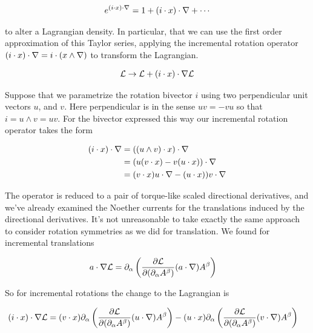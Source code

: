 \begin{align}\label{eqn:rotationCurrents:foo1}
e^{(i \cdot x) \cdot \nabla} = 1 + (i \cdot x) \cdot \nabla + \cdots
\end{align}

to alter a Lagrangian density.  In particular, that we can use the first order approximation of this Taylor series, applying the incremental rotation operator $(i \cdot x) \cdot \nabla = i \cdot (x \wedge \nabla)$ to transform the Lagrangian.

\begin{align}\label{eqn:rotationCurrents:foo2}
\mathcal{L} \rightarrow \mathcal{L} + (i \cdot x) \cdot \nabla \mathcal{L}
\end{align}

Suppose that we parametrize the rotation bivector $i$ using two perpendicular unit vectors $u$, and $v$.  Here perpendicular is in the sense $u v = -v u$ so that $i = u \wedge v = u v$.  For the bivector expressed this way our incremental rotation operator takes the form

\begin{align*}
(i \cdot x) \cdot \nabla 
&=
((u \wedge v) \cdot x) \cdot \nabla \\
&=
(u (v \cdot x) - v (u \cdot x)) \cdot \nabla \\
&=
(v \cdot x) u \cdot \nabla - (u \cdot x)) v \cdot \nabla \\
\end{align*}

The operator is reduced to a pair of torque-like scaled directional derivatives, and we've already examined the Noether currents for the translations induced by the directional derivatives.  It's not unreasonable to take exactly the same approach to consider rotation symmetries as we did for translation.  We found for incremental translations

\begin{align}\label{eqn:rotationCurrents:foo3}
a \cdot \nabla \mathcal{L}
&=
\partial_\alpha \left(
\frac{\partial {\mathcal{L}}}{\partial {(\partial_\alpha A^\beta)}} (a \cdot \nabla) {A^\beta}
\right) 
\end{align}

So for incremental rotations the change to the Lagrangian is 

\begin{align}\label{eqn:rotationCurrents:foo4}
(i \cdot x) \cdot \nabla \mathcal{L}
&=
(v \cdot x)
\partial_\alpha \left(
\frac{\partial {\mathcal{L}}}{\partial {(\partial_\alpha A^\beta)}} (u \cdot \nabla) {A^\beta}
\right) 
-(u \cdot x)
\partial_\alpha \left(
\frac{\partial {\mathcal{L}}}{\partial {(\partial_\alpha A^\beta)}} (v \cdot \nabla) {A^\beta}
\right) 
\end{align}

